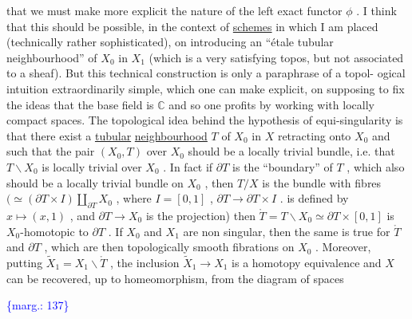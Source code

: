\documentclass[11pt]{article}
\newcommand{\scanpage}[1]{\par\bigskip\noindent{\small\sffamily[scan #1]}\par}
\newcommand{\mspage}[1]{{\small\sffamily[p.\,#1]}}
\newcommand{\margin}[1]{\textcolor{blue}{\{\textsf{marg.:} #1\}}}
\newcommand{\uline}[1]{\underline{#1}}
\newenvironment{diagramblock}{\par\begin{center}}{\end{center}\par}
\begin{document}
that we must make more explicit the nature of the left exact
functor $\phi$ . I think that this should be possible, in the context
of \uline{schemes} in which I am placed (technically rather sophisticated),
on introducing an ``étale tubular neighbourhood'' of $X_0$ in $X_1$
(which is a very satisfying topos, but not associated to a sheaf).
But this technical construction is only a paraphrase of a topol-%
ogical intuition extraordinarily simple, which one can make
explicit, on supposing to fix the ideas that the base field is
$\mathbb{C}$ and so one profits by working with locally compact spaces.
The topological idea behind the hypothesis of equi-singularity is
that there exist a \uline{tubular} \uline{neighbourhood} $T$ of $X_0$ in $X$
retracting onto $X_0$ and such that the pair $(X_0, T)$ over $X_0$
should be a locally trivial bundle, i.e. that $T\backslash X_0$ is locally
trivial over $X_0$ . In fact if $\partial T$ is the ``boundary'' of $T$ ,
which also should be a locally trivial bundle on $X_0$ , then $T/X$
is the bundle with fibres
$(\simeq (\partial T \times I) \amalg_{\partial T} X_0$ , where $I = [0, 1]$ , $\partial T \to \partial T \times I$ . is defined
by $x \longmapsto (x, 1)$ , and $\partial T \to X_0$ is the projection) then
$\mathring{T} = T\backslash X_0 \simeq \partial T \times [0, 1]$ is $X_0$-homotopic to $\partial T$ . If $X_0$ and
$X_1$ are non singular, then the same is true for $\mathring{T}$ and $\partial T$ ,
which are then topologically smooth fibrations on $X_0$ . Moreover,
putting $\tilde{X}_1 = X_1\backslash\mathring{T}$ , the inclusion $\tilde{X}_1 \to X_1$ is a homotopy equivalence
and $X$ can be recovered, up to homeomorphism, from the diagram
of spaces
\begin{diagramblock}\end{diagramblock}

\margin{137}

\clearpage
\scanpage{134-2/137}
\mspage{- 10 -}
\end{document}
